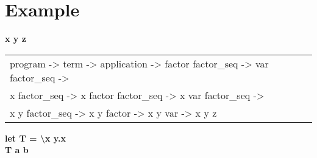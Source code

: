 \documentclass{article}
\begin{document}
\section*{Example}
\begin{flushleft}
\textbf{x y z} \\
\begin{tabular}{l}
program -> term -> application -> factor factor\_seq -> var factor\_seq -> \\
x factor\_seq -> x factor factor\_seq -> x var factor\_seq -> \\
x y factor\_seq -> x y factor -> x y var -> x y z \\
\end{tabular}
\vspace{1em}

\textbf{let T = \textbackslash x y.x \\
T a b}


\end{flushleft}
\end{document}
